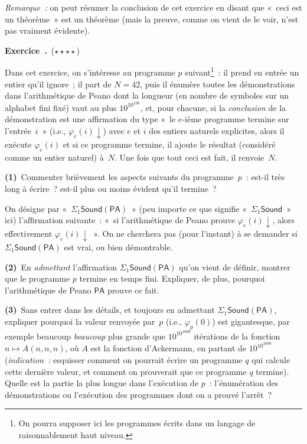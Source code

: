 \documentclass[12pt,a4paper]{article}
\theoremstyle{definition}
\newcommand\exercice{%
\refstepcounter{comcnt}\bigskip\noindent\textbf{Exercice~\thecomcnt.}}
\begin{document}
\emph{Remarque :} on peut résumer la conclusion de cet exercice en
disant que « ceci est un théorème » est un théorème (mais la preuve,
comme on vient de le voir, n'est pas vraiment évidente).

%

\exercice\ (${\star}{\star}{\star}{\star}$)\par\nobreak

Dans cet exercice, on s'intéresse au programme $p$ suivant\footnote{On
pourra supposer ici les programmes écrits dans un langage de
raisonnablement haut niveau.} : il prend en entrée un entier qu'il
ignore ; il part de $N=42$, puis il énumère toutes les démonstrations
dans l'arithmétique de Peano dont la longueur (en nombre de symboles
sur un alphabet fini fixé) vaut au plus $10^{10^{100}}$, et, pour
chacune, si la \emph{conclusion} de la démonstration est une
affirmation du type « le $e$-ième programme termine sur l'entrée $i$ »
(i.e., $\varphi_e(i){\downarrow}$) avec $e$ et $i$ des entiers
naturels explicites, alors il exécute $\varphi_e(i)$ et si ce
programme termine, il ajoute le résultat (considéré comme un entier
naturel) à $N$.  Une fois que tout ceci est fait, il renvoie $N$.

\textbf{(1)} Commenter brièvement les aspects suivants du
programme $p$ : est-il très long à écrire ? est-il plus ou moins
évident qu'il termine ?

On désigne par « $\Sigma_1\mathsf{Sound}(\mathsf{PA})$ » (peu importe
ce que signifie « $\Sigma_1\mathsf{Sound}$ » ici) l'affirmation
suivante : « si l'arithmétique de Peano prouve
$\varphi_e(i){\downarrow}$, alors effectivement
$\varphi_e(i){\downarrow}$ ».  On ne cherchera pas (pour l'instant) à
se demander si $\Sigma_1\mathsf{Sound}(\mathsf{PA})$ est vrai, ou bien
démontrable.

\textbf{(2)} En \emph{admettant} l'affirmation
$\Sigma_1\mathsf{Sound}(\mathsf{PA})$ qu'on vient de définir, montrer
que le programme $p$ termine en temps fini.  Expliquer, de plus,
pourquoi l'arithmétique de Peano $\mathsf{PA}$ prouve ce fait.

\textbf{(3)} Sans entrer dans les détails, et toujours en admettant
$\Sigma_1\mathsf{Sound}(\mathsf{PA})$, expliquer pourquoi la valeur
renvoyée par $p$ (i.e., $\varphi_p(0)$) est gigantesque, par exemple
beaucoup \emph{beaucoup} plus grande que $10^{10^{1000}}$ itérations
de la fonction $n \mapsto A(n,n,n)$, où $A$ est la fonction
d'Ackermann, en partant de $10^{10^{1000}}$ (\emph{indication :}
esquisser comment on pourrait écrire un programme $q$ qui calcule
cette dernière valeur, et comment on prouverait que ce programme $q$
termine).  Quelle est la partie la plus longue dans l'exécution de
$p$ : l'énumération des démonstrations ou l'exécution des programmes
dont on a prouvé l'arrêt ?
\end{document}
